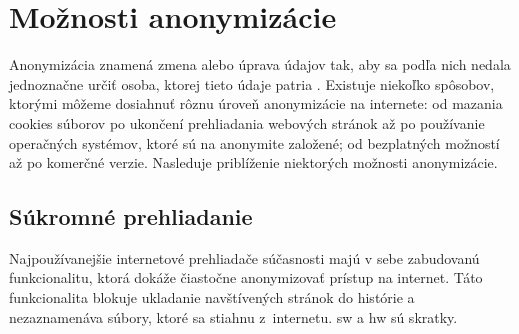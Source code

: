 \section{Možnosti anonymizácie}
\noindent Anonymizácia znamená zmena alebo úprava údajov tak, aby sa podľa nich nedala jednoznačne určiť osoba, ktorej tieto údaje patria \cite{t01}. Existuje niekoľko spôsobov, ktorými môžeme dosiahnuť rôznu úroveň anonymizácie na internete: od mazania cookies súborov po ukončení prehliadania webových stránok až po používanie operačných systémov, ktoré sú na anonymite založené; od bezplatných možností až po komerčné verzie.  
\newline Nasleduje priblíženie niektorých možnosti anonymizácie.

\subsection{Súkromné prehliadanie}
\noindent Najpoužívanejšie internetové prehliadače súčasnosti majú v sebe zabudovanú funkcionalitu, ktorá dokáže čiastočne anonymizovať prístup na internet. Táto funkcionalita blokuje ukladanie navštívených stránok do histórie a nezaznamenáva súbory, ktoré sa stiahnu z~internetu. \acrshort{sw} a \acrlong{hw} sú skratky.

